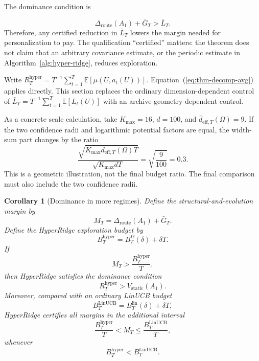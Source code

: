 \documentclass{article} %
\newtheorem{corollary}[theorem]{Corollary}
\providecommand{\Droute}{\Delta_{\mathrm{route}}}
\renewcommand{\eqref}[1]{\textup{(\ref{#1})}}
\begin{document}
The dominance condition is

\begin{equation}
\Droute(A_1) + \bar{G}_T > \bar{L}_T .
\end{equation}
Therefore, any certified reduction in $\bar L_T$ lowers the margin needed for
personalization to pay. The qualification ``certified'' matters: the theorem
does not claim that an arbitrary covariance estimate, or the periodic estimate
in Algorithm~\ref{alg:hyper-ridge}, reduces exploration.




Write
\(R_T^{\mathrm{hyper}}
=T^{-1}\sum_{t=1}^{T}\mathbb{E}[\mu(U,a_t(U))]\).
Equation~\eqref{eq:thm-decomp-avg} applies directly. This section replaces the
ordinary dimension-dependent control of
\(\bar L_T=T^{-1}\sum_{t=1}^{T}\mathbb{E}[L_t(U)]\)
with an archive-geometry-dependent control.

As a concrete scale calculation, take \(K_{\max}=16\), \(d=100\), and
\(\bar d_{\mathrm{eff},T}(\Omega)=9\).
If the two confidence radii and logarithmic potential factors are equal, the width-sum part changes by the ratio
\begin{equation}
\label{eq:hyper-example-ratio}
\frac{
\sqrt{K_{\max}\bar d_{\mathrm{eff},T}(\Omega)T}
}{
\sqrt{K_{\max}dT}
}
=
\sqrt{\frac{9}{100}}
=
0.3.
\end{equation}
This is a geometric illustration, not the final budget ratio. The final comparison must also include the two confidence radii.

\begin{corollary}[Dominance in more regimes]
\label{cor:hyper-dominance}
Define the structural-and-evolution margin by
\begin{equation}
\label{eq:hyper-margin}
M_T
=
\Delta_{\mathrm{route}}(A_1)+\bar G_T.
\end{equation}
Define the HyperRidge exploration budget by
\begin{equation}
\label{eq:hyper-budget}
B_T^{\mathrm{hyper}}
=
B_T^\Omega(\delta)+\delta T.
\end{equation}
If
\begin{equation}
\label{eq:hyper-dom-condition}
M_T
>
\frac{B_T^{\mathrm{hyper}}}{T},
\end{equation}
then HyperRidge satisfies the dominance condition
\begin{equation}
\label{eq:hyper-dom-reward}
R_T^{\mathrm{hyper}}
>
V_{\mathrm{static}}(A_1).
\end{equation}
Moreover, compared with an ordinary LinUCB budget
\begin{equation}
\label{eq:hyper-linucb-budget}
B_T^{\mathrm{LinUCB}}
=
B_T^{\mathrm{lin}}(\delta)+\delta T,
\end{equation}
HyperRidge certifies all margins in the additional interval
\begin{equation}
\label{eq:hyper-new-regime}
\frac{B_T^{\mathrm{hyper}}}{T}
<
M_T
\le
\frac{B_T^{\mathrm{LinUCB}}}{T},
\end{equation}
whenever
\begin{equation}
\label{eq:hyper-budget-order}
B_T^{\mathrm{hyper}}
<
B_T^{\mathrm{LinUCB}}.
\end{equation}
\end{corollary}
\end{document}
